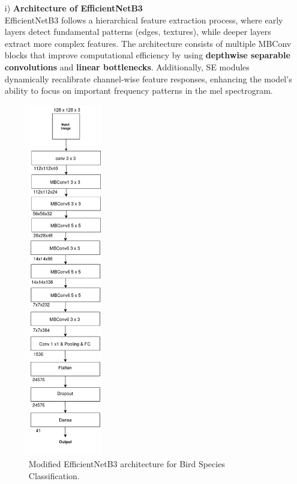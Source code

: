      \begin{itemize}
      \item[i)] \textbf{Architecture of EfficientNetB3} \\
            EfficientNetB3 follows a hierarchical feature extraction process, where early layers detect fundamental patterns (edges, textures), while deeper layers extract more complex features. The architecture consists of multiple MBConv blocks that improve computational efficiency by using \textbf{depthwise separable convolutions} and \textbf{linear bottlenecks}. Additionally, SE modules dynamically recalibrate channel-wise feature responses, enhancing the model’s ability to focus on important frequency patterns in the mel spectrogram.
            
            \begin{figure}[h!]
                  \centering
                  \includegraphics[width=0.3\textwidth]{images/MajorProject-efficientNetB3 architecture.png}
                  \caption{Modified EfficientNetB3 architecture for Bird Species Classification.}
                  \label{fig:efficientnetb3}
            \end{figure}
            

\end{itemize}
